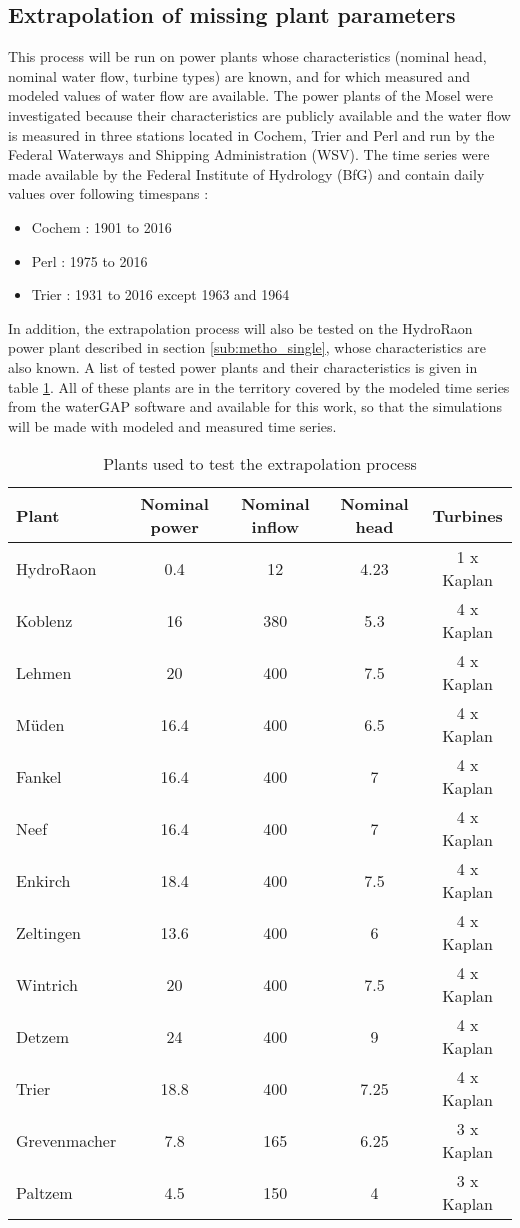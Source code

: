 \subsection{Extrapolation of missing plant parameters}
\label{sub:metho_extra}
This process will be run on power plants whose characteristics (nominal head, nominal water flow, turbine types) are known, and for which measured and modeled values of water flow are available. \newline
The power plants of the Mosel were investigated because their characteristics are publicly available \cite{mosel} and the water flow is measured in three stations located in Cochem, Trier and Perl and run by the Federal Waterways and Shipping Administration (WSV). The time series were made available by the Federal Institute of Hydrology (BfG) and contain daily values over following timespans :
\begin{itemize}
\itemsep0em
 \item Cochem \tabto{2cm}: 1901 to 2016
 \item Perl \tabto{2cm}: 1975 to 2016
 \item Trier \tabto{2cm}: 1931 to 2016 except 1963 and 1964
\end{itemize}
In addition, the extrapolation process will also be tested on the HydroRaon power plant described in section \ref{sub:metho_single}, whose characteristics are also known. A list of tested power plants and their characteristics is given in table \ref{plants_to_test}. All of these plants are in the territory covered by the modeled time series from the waterGAP software and available for this work, so that the simulations will be made with modeled and measured time series.
\begin{table}
 \caption{Plants used to test the extrapolation process}
 \footnotesize
 \label{plants_to_test}
 \centering
 \begin{tabular}{|l|c|c|c|c|}
 \hline
 Plant&Nominal power&Nominal inflow&Nominal head&Turbines\\
 \hline
 HydroRaon&0.4&12&4.23&1 x Kaplan\\
 Koblenz&16&380&5.3&4 x Kaplan\\
 Lehmen&20&400&7.5&4 x Kaplan\\
 Müden&16.4&400&6.5&4 x Kaplan\\
 Fankel&16.4&400&7&4 x Kaplan\\
 Neef&16.4&400&7&4 x Kaplan\\
 Enkirch&18.4&400&7.5&4 x Kaplan\\
 Zeltingen&13.6&400&6&4 x Kaplan\\
 Wintrich&20&400&7.5&4 x Kaplan\\
 Detzem&24&400&9&4 x Kaplan\\
 Trier&18.8&400&7.25&4 x Kaplan\\
 Grevenmacher&7.8&165&6.25&3 x Kaplan\\
 Paltzem&4.5&150&4&3 x Kaplan\\
 \hline
 \end{tabular}
\end{table}

